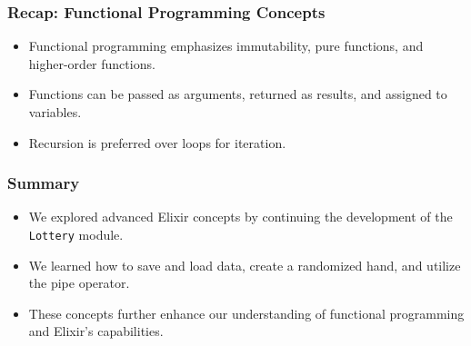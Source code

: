 \documentclass[aspectratio=169, table]{beamer}
\begin{document}
	\begin{frame}
		\frametitle{Recap: Functional Programming Concepts}
		\begin{itemize}
			\item Functional programming emphasizes immutability, pure functions, and higher-order functions.
			\item Functions can be passed as arguments, returned as results, and assigned to variables.
			\item Recursion is preferred over loops for iteration.
		\end{itemize}
	\end{frame}
	
	\begin{frame}
		\frametitle{Summary}
		\begin{itemize}
			\item We explored advanced Elixir concepts by continuing the development of the \texttt{Lottery} module.
			\item We learned how to save and load data, create a randomized hand, and utilize the pipe operator.
			\item These concepts further enhance our understanding of functional programming and Elixir's capabilities.
		\end{itemize}
	\end{frame}
	
\end{document}
